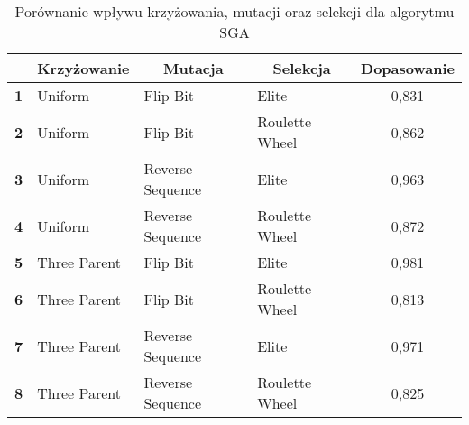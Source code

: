 \documentclass{classrep}
\begin{document}
\begin{table}[H]
\begin{tabular}{|l|l|l|l|c|}
\hline
           & \multicolumn{1}{c|}{\textbf{Krzyżowanie}} & \multicolumn{1}{c|}{\textbf{Mutacja}} & \multicolumn{1}{c|}{\textbf{Selekcja}} & \textbf{Dopasowanie} \\ \hline
\textbf{1} & Uniform                                   & Flip Bit                              & Elite                                  & 0,831                \\ \hline
\textbf{2} & Uniform                                   & Flip Bit                              & Roulette Wheel                         & 0,862                \\ \hline
\textbf{3} & Uniform                                   & Reverse Sequence                      & Elite                                  & 0,963                \\ \hline
\textbf{4} & Uniform                                   & Reverse Sequence                      & Roulette Wheel                         & 0,872                \\ \hline
\textbf{5} & Three Parent                              & Flip Bit                              & Elite                                  & 0,981                \\ \hline
\textbf{6} & Three Parent                              & Flip Bit                              & Roulette Wheel                         & 0,813                \\ \hline
\textbf{7} & Three Parent                              & Reverse Sequence                      & Elite                                  & 0,971                \\ \hline
\textbf{8} & Three Parent                              & Reverse Sequence                      & Roulette Wheel                         & 0,825                \\ \hline
\end{tabular}
\caption{Porównanie wpływu krzyżowania, mutacji oraz selekcji dla algorytmu SGA}
\label{tab:calc1}
\end{table}
\end{document}

